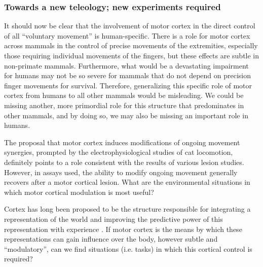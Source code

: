 \subsubsection*{Towards a new teleology; new experiments required}

It should now be clear that the involvement of motor cortex in the direct control of all ``voluntary movement'' is human-specific. There is a role for motor cortex across mammals in the control of precise movements of the extremities, especially those requiring individual movements of the fingers, but these effects are subtle in non-primate mammals. Furthermore, what would be a devastating impairment for humans may not be so severe for mammals that do not depend on precision finger movements for survival. Therefore, generalizing this specific role of motor cortex from humans to all other mammals would be misleading. We could be missing another, more primordial role for this structure that predominates in other mammals, and by doing so, we may also be missing an important role in humans.

The proposal that motor cortex induces modifications of ongoing movement synergies, prompted by the electrophysiological studies of cat locomotion, definitely points to a role consistent with the results of various lesion studies. However, in assays used, the ability to modify ongoing movement generally recovers after a motor cortical lesion. What are the environmental situations in which motor cortical modulation is most useful?

Cortex has long been proposed to be the structure responsible for integrating a representation of the world and improving the predictive power of this representation with experience \cite{Barlow1985,Doya1999}. If motor cortex is the means by which these representations can gain influence over the body, however subtle and ``modulatory'', can we find situations (i.e. tasks) in which this cortical control is required?


